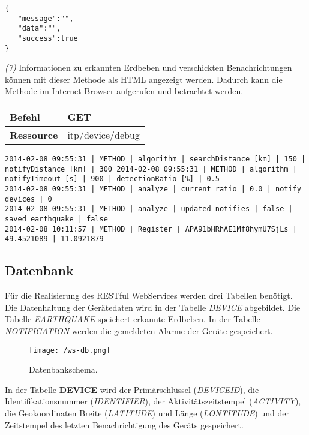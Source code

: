 \begin{lstlisting}[caption={Rückgabe}]
{
   "message":"",
   "data":"",
   "success":true
}
\end{lstlisting} 

\textit{(7)} Informationen zu erkannten Erdbeben und verschickten Benachrichtungen können mit dieser Methode als HTML angezeigt werden. Dadurch kann die Methode im Internet-Browser aufgerufen und betrachtet werden.

\begin{table}[!htb] 
    \begin{tabular}{l|l}
    \textbf{Befehl}    & GET                                          \\ \hline
    \textbf{Ressource} & itp/device/debug \\ 
    \end{tabular}
\end{table}

\begin{lstlisting}[caption={Rückgabe als HTML}]
2014-02-08 09:55:31 | METHOD | algorithm | searchDistance [km] | 150 | notifyDistance [km] | 300 2014-02-08 09:55:31 | METHOD | algorithm | notifyTimeout [s] | 900 | detectionRatio [%] | 0.5
2014-02-08 09:55:31 | METHOD | analyze | current ratio | 0.0 | notify devices | 0 
2014-02-08 09:55:31 | METHOD | analyze | updated notifies | false | saved earthquake | false
2014-02-08 10:11:57 | METHOD | Register | APA91bHRhAE1Mf8hymU7SjLs | 49.4521089 | 11.0921879
\end{lstlisting} 


\subsection{Datenbank}
Für die Realisierung des RESTful WebServices werden drei Tabellen benötigt. Die Datenhaltung der Gerätedaten wird in der Tabelle \textit{DEVICE} abgebildet. Die Tabelle \textit{EARTHQUAKE} speichert erkannte Erdbeben. In der Tabelle \textit{NOTIFICATION} werden die gemeldeten Alarme der Geräte gespeichert.


\begin{figure}[H]
\centering
\texttt{[image: /ws-db.png]}
\caption{Datenbankschema.}
\label{fig:WSDB}
\end{figure}

In der Tabelle \textbf{DEVICE} wird der Primärschlüssel (\textit{DEVICEID}), die Identifikationsnummer (\textit{IDENTIFIER}), der Aktivitätszeitstempel (\textit{ACTIVITY}), die Geokoordinaten Breite (\textit{LATITUDE}) und Länge (\textit{LONTITUDE}) und der Zeitstempel des letzten Benachrichtigung des Geräts gespeichert.

